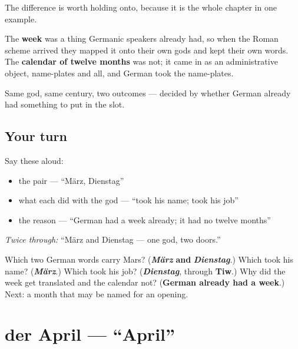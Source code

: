 \begin{culture}
The difference is worth holding onto, because it is the whole chapter in one example.

The \textbf{week} was a thing Germanic speakers already had, so when the Roman scheme arrived they mapped it onto their own gods and kept their own words. The \textbf{calendar of twelve months} was not; it came in as an administrative object, name-plates and all, and German took the name-plates.

Same god, same century, two outcomes — decided by whether German already had something to put in the slot.
\end{culture}

\subsection*{Your turn}
Say these aloud:

\begin{itemize}
\raggedright
  \item the pair — \textquotedblleft{}März, Dienstag\textquotedblright{}
  \item what each did with the god — \textquotedblleft{}took his name; took his job\textquotedblright{}
  \item the reason — \textquotedblleft{}German had a week already; it had no twelve months\textquotedblright{}
\end{itemize}

\emph{Twice through:} \textquotedblleft{}März and Dienstag — one god, two doors.\textquotedblright{}

\begin{tcolorbox}[breakable,colback=teal!4,colframe=teal!35!black,title={Before you move on}]
Which two German words carry Mars? (\emph{\textbf{März}} \textbf{and} \emph{\textbf{Dienstag}}.) Which took his name? (\emph{\textbf{März}}.) Which took his job? (\emph{\textbf{Dienstag}}, through \textbf{Tiw}.) Why did the week get translated and the calendar not? (\textbf{German already had a week}.) Next: a month that may be named for an opening.
\end{tcolorbox}
\section[der April]{der April — \textquotedblleft{}April\textquotedblright{}}

\label{lesson:GE-C09-april}



